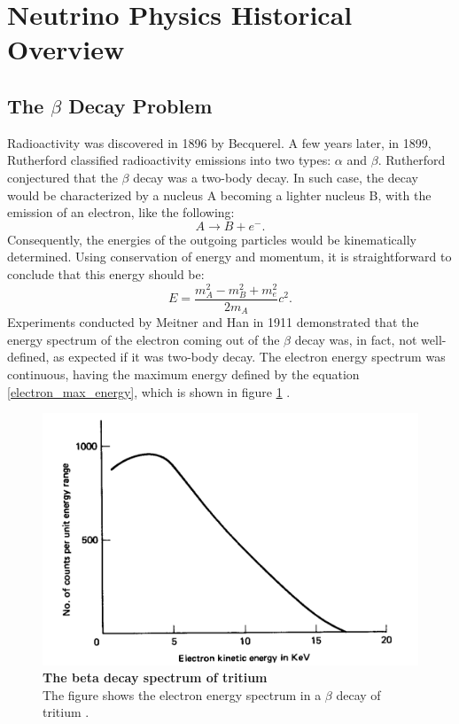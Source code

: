 \section{Neutrino Physics Historical Overview}
\label{Chapter:1}

\subsection{The $\beta$ Decay Problem}

Radioactivity was discovered in 1896 by Becquerel. A few years later, in 1899, Rutherford classified radioactivity emissions into two types: $\alpha$ and $\beta$. Rutherford conjectured that the $\beta$ decay was a two-body decay. In such case, the decay would be characterized by a nucleus A becoming a lighter nucleus B, with the emission of an electron, like the following:
%
\begin{equation}
	A \longrightarrow B + e^- .
\end{equation}
%
Consequently, the energies of the outgoing particles would be kinematically determined. 
Using conservation of energy and momentum, it is straightforward to conclude that this energy should be:
%
\begin{equation}
	E = \frac{m_A^2 - m_B^2 + m_e^2}{2m_A} c^2.
	\label{electron_max_energy} 
\end{equation}
%
Experiments conducted by Meitner and Han in 1911 demonstrated that the energy spectrum of the electron coming out of the $\beta$ decay was, in fact, not well-defined, as expected if it was two-body decay. The electron energy spectrum was continuous, having the maximum energy defined by the equation \ref{electron_max_energy}, which is shown in figure \ref{figure_the_beta_decay_spectrum_of_tritium} \cite{griffiths}.
%
\begin{figure}[h!]
	\begin{center}
		\includegraphics[scale=0.3]{Figures/electron_beta_decay_spectrum.pdf}
		\caption[The $\beta$ decay spectrum of tritium]{ {\textbf{The beta decay spectrum of tritium}} \\The figure shows the electron energy spectrum in a $\beta$ decay of tritium \cite{griffiths}.}
		\label{figure_the_beta_decay_spectrum_of_tritium}	
	\end{center}
\end{figure}
%

